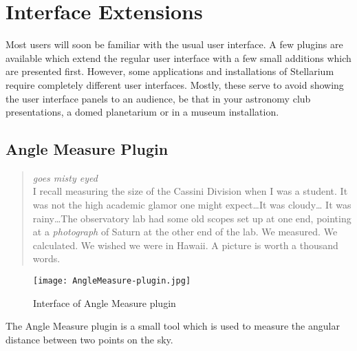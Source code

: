 
\chapter{Interface Extensions}
\label{ch:plugins:Interfaces}

Most users will soon be familiar with the usual user interface. A few
plugins are available which extend the regular user interface with a
few small additions which are presented first.  However, some
applications and installations of Stellarium require completely
different user interfaces. Mostly, these serve to avoid showing the
user interface panels to an audience, be that in your astronomy club
presentations, a domed planetarium or in a museum installation.


\section{Angle Measure Plugin}
\label{sec:plugins:AngleMeasure}

\begin{quotation}\small
\noindent\emph{goes misty eyed}\\ 
I recall measuring the size of the Cassini Division when I was a student.
It was not the high academic glamor one might expect\ldots It was cloudy\ldots
It was rainy\ldots The observatory lab had some old scopes set up at one
end, pointing at a \emph{photograph} of Saturn at the other end of the
lab. We measured. We calculated. We wished we were in Hawaii. A picture
is worth a thousand words.
\end{quotation}

\begin{figure}[th]\centering
	\texttt{[image: AngleMeasure-plugin.jpg]}
	\caption{Interface of Angle Measure plugin}
	\label{fig:AngleMeasure}
\end{figure}

\noindent The Angle Measure plugin is a small tool which is used to measure the
angular distance between two points on the sky. 




